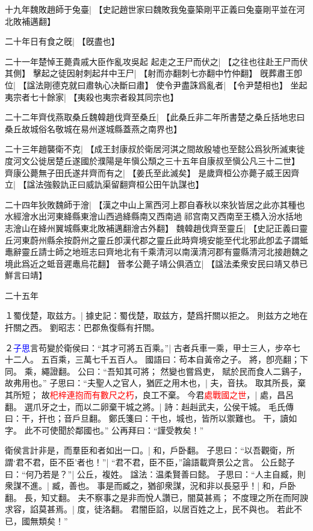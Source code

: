 十九年魏敗趙師于兔臺|{
	【史記趙世家曰魏敗我兔臺築剛平正義曰兔臺剛平並在河北敗補邁翻】}
\par
二十年日有食之旣|{
	【旣盡也】}
\par



二十一年楚悼王薨貴戚大臣作亂攻吳起 起走之王尸而伏之|{
	【之往也往赴王尸而伏其側】}
擊起之徒因射刺起幷中王尸|{
	【射而亦翻刺七亦翻中竹仲翻】}
旣葬肅王卽位|{
	【諡法剛德克就曰肅執心决斷曰肅】}
使令尹盡誅爲亂者|{
	【令尹楚相也】}
坐起夷宗者七十餘家|{
	【夷殺也夷宗者殺其同宗也】}
\par
二十二年齊伐燕取桑丘魏韓趙伐齊至桑丘|{
	【此桑丘非二年所書楚之桑丘括地忠曰桑丘故城俗名敬城在易州遂城縣蓋燕之南界也】}
\par
二十三年趙襲衛不克|{
	【成王封康叔於衛居河淇之間故殷墟也至懿公爲狄所滅東徙度河文公徙居楚丘遂國於濮陽是年愼公頹之三十五年自康叔至愼公凡三十二世】}
齊康公薨無子田氏遂幷齊而有之|{
	【姜氏至此滅矣】}
是歲齊桓公亦薨子威王因齊立|{
	【諡法強毅訅正曰威訅渠留翻齊桓公田午訅謀也】}
\par
二十四年狄敗魏師于澮|{
	【漢之中山上黨西河上郡自春秋以來狄皆居之此亦其種也水經澮水出河東絳縣東澮山西過絳縣南又西南過祁宫南又西南至王橋入汾水括地志澮山在絳州翼城縣東北敗補邁翻澮古外翻】}
魏韓趙伐齊至靈丘|{
	【史記正義曰靈丘河東蔚州縣余按蔚州之靈丘卽漢代郡之靈丘此時齊境安能至代北邪此卽孟子謂蚳鼃辭靈丘請士師之地班志曰齊地北有千乘清河以南漢清河郡有靈縣清河北接趙魏之境此爲近之蚳音遲鼃烏花翻】}
晉孝公薨子靖公俱酒立|{
	【諡法柔衆安民曰靖又恭已鮮言曰靖】}


二十五年

１蜀伐楚，取兹方。|{
	據史記：蜀伐楚，取兹方，楚爲扞關以拒之。
	則兹方之地在扞關之西。
	劉昭志：巴郡魚復縣有扞關。
	}

２\textcolor{blue}{子思}言苟變於衛侯曰：“其才可將五百乘。”|{
	古者兵車一乘，甲士三人，步卒七十二人。
	五百乘，三萬七千五百人。
	國語曰：苟本自黃帝之子。
	將，卽亮翻；下同。
	乘，繩證翻。
	}
公曰：“吾知其可將；
	然變也嘗爲吏，
	賦於民而食人二鷄子，
	故弗用也。”
子思曰：“夫聖人之官人，猶匠之用木也，|{
	夫，音扶。
	}
取其所長，棄其所短；
故\textcolor{red}{𣏌梓連抱而有數尺之朽}，良工不棄。
今君\textcolor{red}{處戰國之世}，|{
	處，昌呂翻。
	}
選爪牙之士，而以二卵棄干城之將。|{
	詩：赳赳武夫，公侯干城。
	毛氏傳曰：干，扞也；音戶旦翻。
	鄭氏箋曰：干也，城也，皆所以禦難也。
	干，讀如字。
	}
此不可使聞於鄰國也。”
公再拜曰：“謹受教矣！”

衛侯言計非是，而羣臣和者如出一口。|{
	和，戶卧翻。
	}
子思曰：“以吾觀衛，所謂‘君不君，臣不臣’者也！”|{
	“君不君，臣不臣，”論語載齊景公之言。
	}
公丘懿子曰：“何乃若是？”|{
	公丘，複姓。
	諡法：温柔賢善曰懿。
	}
子思曰：“人主自臧，則衆謀不進。|{
	臧，善也。}
事是而臧之，猶卻衆謀，況和非以長惡乎！|{
	和，戶卧翻。
	長，知丈翻。}
夫不察事之是非而悅人讚已，闇莫甚焉；
不度理之所在而阿諛求容，諂莫甚焉。|{
	度，徒洛翻。}
君闇臣諂，以居百姓之上，民不與也。
若此不已，國無類矣！”

